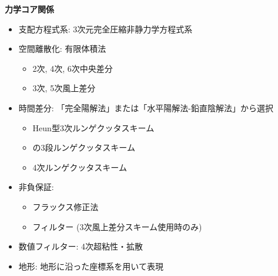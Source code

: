{\bf 力学コア関係}
\begin{itemize}
 \item 支配方程式系: 3次元完全圧縮非静力学方程式系
 \item 空間離散化: 有限体積法
    \begin{itemize}
      \item 2次, 4次, 6次中央差分
      \item 3次, 5次風上差分
    \end{itemize}
 \item 時間差分: 「完全陽解法」または「水平陽解法-鉛直陰解法」から選択
    \begin{itemize}
      \item Heun型3次ルンゲクッタスキーム
      \item \citet{Wicker_2002}の3段ルンゲクッタスキーム
      \item 4次ルンゲクッタスキーム
    \end{itemize}
 \item 非負保証:
    \begin{itemize}
      \item フラックス修正法 \citep[Flux Corrected Transport, FCT; ][]{zalesak_1979}
      \item \citet{Koren_1993}フィルター  (3次風上差分スキーム使用時のみ)
    \end{itemize}
 \item 数値フィルター: 4次超粘性・拡散
 \item 地形: 地形に沿った座標系を用いて表現
\end{itemize}

